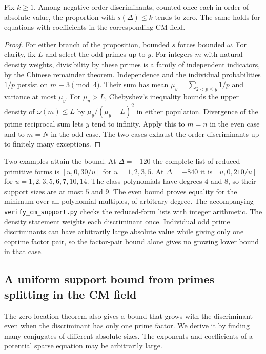 \begin{corollary}
Fix $k\ge1$. Among negative order discriminants, counted once each in
order of absolute value, the proportion with $s(\Delta)\le k$ tends to zero.
The same holds for equations with coefficients in the corresponding CM field.
\end{corollary}
\begin{proof}
For either branch of the proposition, bounded $s$ forces bounded $\omega$.
For clarity, fix $L$ and select the odd primes up to $y$. For
integers $m$ with natural-density weights, divisibility by these primes is a
family of independent indicators, by the Chinese remainder theorem.
Independence and the individual probabilities $1/p$ persist on
$m\equiv3\pmod4$. Their sum has mean $\mu_y=\sum_{2<p\le y}1/p$
and variance at most $\mu_y$. For $\mu_y>L$, Chebyshev's inequality bounds
the upper density of $\omega(m)\le L$ by $\mu_y/(\mu_y-L)^2$ in either
population. Divergence of the prime reciprocal sum lets $y$ tend to
infinity. Apply this to $m=n$ in the even case and to $m=N$ in the odd case.
The two cases exhaust the order discriminants up to finitely many exceptions.
\end{proof}

Two examples attain the bound. At $\Delta=-120$ the complete list of
reduced primitive forms is $[u,0,30/u]$ for $u=1,2,3,5$. At $\Delta=-840$
it is $[u,0,210/u]$ for $u=1,2,3,5,6,7,10,14$. The class polynomials have
degrees $4$ and $8$, so their support sizes are at most $5$ and $9$.
The even bound proves equality for the minimum over all polynomial
multiples, of arbitrary degree. The accompanying
\texttt{verify\_cm\_support.py} checks the reduced-form lists with integer
arithmetic. The density statement weights each discriminant once. Individual
odd prime discriminants can have arbitrarily large absolute value while
giving only one coprime factor pair, so the factor-pair bound alone gives no growing lower bound in that case.

\subsection{A uniform support bound from primes splitting in the CM field}

The zero-location theorem also gives a bound that grows with the discriminant
even when the discriminant has only one prime factor. We derive it by finding
many conjugates of different absolute sizes. The exponents and coefficients
of a potential sparse equation may be arbitrarily large.

